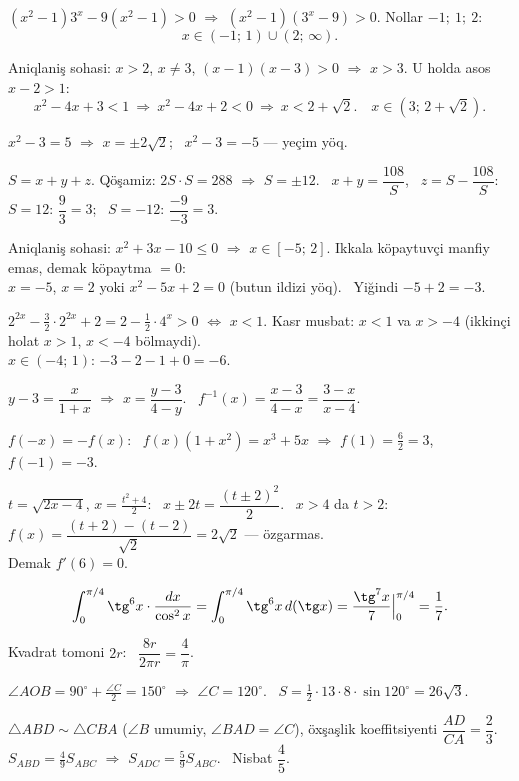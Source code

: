 $\left(x^2-1\right)3^x-9\left(x^2-1\right)>0$ $\Rightarrow$ $\left(x^2-1\right)\left(3^x-9\right)>0$. Nollar $-1;\ 1;\ 2$:
\[x\in(-1;\,1)\cup(2;\,\infty).\]

Aniqlaniş sohasi: $x>2$, $x\ne3$, $(x-1)(x-3)>0$ $\Rightarrow$ $x>3$. U holda asos $x-2>1$:
\[x^2-4x+3<1\ \Rightarrow\ x^2-4x+2<0\ \Rightarrow\ x<2+\sqrt2.\quad x\in\left(3;\,2+\sqrt2\right).\]

$x^2-3=5$ $\Rightarrow$ $x=\pm2\sqrt2$; \ $x^2-3=-5$ — yeçim yöq.

$S=x+y+z$. Qöşamiz: $2S\cdot S=288$ $\Rightarrow$ $S=\pm12$. \ $x+y=\dfrac{108}S$, \ $z=S-\dfrac{108}S$:\\
$S=12$: $\dfrac9{3}=3$; \ $S=-12$: $\dfrac{-9}{-3}=3$.

Aniqlaniş sohasi: $x^2+3x-10\le0$ $\Rightarrow$ $x\in[-5;\,2]$. Ikkala köpaytuvçi manfiy emas, demak köpaytma $=0$:\\
$x=-5$, $x=2$ yoki $x^2-5x+2=0$ (butun ildizi yöq). \ Yiğindi $-5+2=-3$.

$2^{2x}-\frac32\cdot2^{2x}+2=2-\frac12\cdot4^x>0$ $\Leftrightarrow$ $x<1$. Kasr musbat: $x<1$ va $x>-4$ (ikkinçi holat $x>1$, $x<-4$ bölmaydi).\\
$x\in(-4;\,1)$: $-3-2-1+0=-6$.

$y-3=\dfrac x{1+x}$ $\Rightarrow$ $x=\dfrac{y-3}{4-y}$. \ $f^{-1}(x)=\dfrac{x-3}{4-x}=\dfrac{3-x}{x-4}$.

$f(-x)=-f(x)$: \ $f(x)\left(1+x^2\right)=x^3+5x$ $\Rightarrow$ $f(1)=\frac62=3$, \ $f(-1)=-3$.

$t=\sqrt{2x-4}$, $x=\frac{t^2+4}2$: \ $x\pm2t=\dfrac{(t\pm2)^2}2$. \ $x>4$ da $t>2$: \ $f(x)=\dfrac{(t+2)-(t-2)}{\sqrt2}=2\sqrt2$ — özgarmas.\\
Demak $f'(6)=0$.

\[\int_0^{\pi/4}\tg^6x\cdot\frac{dx}{\cos^2x}=\int_0^{\pi/4}\tg^6x\,d(\tg x)=\frac{\tg^7x}7\Big|_0^{\pi/4}=\frac17.\]

Kvadrat tomoni $2r$: \ $\dfrac{8r}{2\pi r}=\dfrac4\pi$.

$\angle AOB=90^\circ+\frac{\angle C}2=150^\circ$ $\Rightarrow$ $\angle C=120^\circ$. \ $S=\frac12\cdot13\cdot8\cdot\sin120^\circ=26\sqrt3$.

$\triangle ABD\sim\triangle CBA$ ($\angle B$ umumiy, $\angle BAD=\angle C$), öxşaşlik koeffitsiyenti $\dfrac{AD}{CA}=\dfrac23$.\\
$S_{ABD}=\frac49S_{ABC}$ $\Rightarrow$ $S_{ADC}=\frac59S_{ABC}$. \ Nisbat $\dfrac45$.

